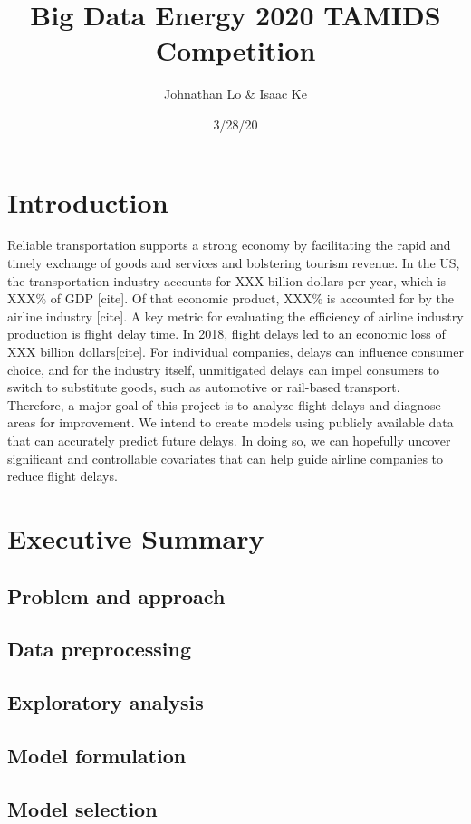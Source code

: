 \documentclass[12pt, a4paper]{book}
\title{Big Data Energy 2020 TAMIDS Competition}
\author{Johnathan Lo \& Isaac Ke}
\date{3/28/20}
\newcommand\tab[1][1cm]{\hspace*{#1}}
\begin{document}
\maketitle
\tableofcontents
\chapter{Introduction}
\tab Reliable transportation supports a strong economy by facilitating the rapid and timely exchange of goods and services and bolstering tourism revenue. In the US, the transportation industry accounts for XXX billion dollars per year, which is XXX\% of GDP [cite]. Of that economic product, XXX\% is accounted for by the airline industry [cite]. A key metric for evaluating the efficiency of airline industry production is flight delay time. In 2018, flight delays led to an economic loss of XXX billion dollars[cite]. For individual companies, delays can influence consumer choice, and for the industry itself, unmitigated delays can impel consumers to switch to substitute goods, such as automotive or rail-based transport. \\
\tab Therefore, a major goal of this project is to analyze flight delays and diagnose areas for improvement. We intend to create models using publicly available data that can accurately predict future delays. In doing so, we can hopefully uncover significant and controllable covariates that can help guide airline companies to reduce flight delays. 

\chapter{Executive Summary}
	\section{Problem and approach}
	\section{Data preprocessing}
	\section{Exploratory analysis}
	\section{Model formulation}
	\section{Model selection}
\end{document}
